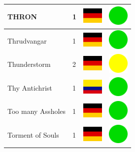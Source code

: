 \documentclass[12pt, a4paper, twoside]{report}
\begin{document}
\begin{center}
\begin{longtable}{|p{5cm}|p{2cm}|p{2cm}|p{2cm}|}
			THRON & 1 & \includegraphics[width=1cm]{4x3/de} & \includegraphics[width=1cm]{likes/y} \\ \hline
			Thrudvangar & 1 & \includegraphics[width=1cm]{4x3/de} & \includegraphics[width=1cm]{likes/y} \\ \hline
			Thunderstorm & 2 & \includegraphics[width=1cm]{4x3/de} & \includegraphics[width=1cm]{likes/m} \\ \hline
			Thy Antichrist & 1 & \includegraphics[width=1cm]{4x3/co} & \includegraphics[width=1cm]{likes/y} \\ \hline
			Too many Assholes & 1 & \includegraphics[width=1cm]{4x3/de} & \includegraphics[width=1cm]{likes/y} \\ \hline
			Torment of Souls & 1 & \includegraphics[width=1cm]{4x3/de} & \includegraphics[width=1cm]{likes/y} \\ \hline

\end{longtable}
\end{center}
\end{document}
